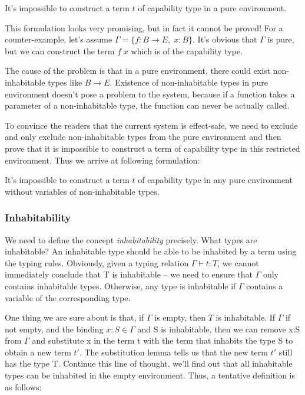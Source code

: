 \begin{definition}
  It's impossible to construct a term $t$ of capability type in a pure
  environment.
\end{definition}

This formulation looks very promising, but in fact it cannot be proved!
For a counter-example, let's assume $\Gamma = \{f: B \to E, \; x:
B\}$. It's obvious that $\Gamma$ is pure, but we can construct the
term $f \; x$ which is of the capability type.

The cause of the problem is that in a pure environment, there could
exist non-inhabitable types like $B \to E$.  Existence of
non-inhabitable types in pure environment doesn't pose a problem to
the system, because if a function takes a parameter of a
non-inhabitable type, the function can never be actually called.

To convince the readers that the current system is effect-safe, we
need to exclude and only exclude non-inhabitable types from the pure
environment and then prove that it is impossible to construct a term
of capability type in this restricted environment. Thus we arrive at
following formulation:

\begin{definition}
  It's impossible to construct a term $t$ of capability type in any
  pure environment without variables of non-inhabitable types.
\end{definition}

\subsubsection{Inhabitability}

We need to define the concept \emph{inhabitability} precisely. What
types are inhabitable? An inhabitable type should be able to be
inhabited by a term using the typing rules. Obviously, given a typing
relation $\Gamma \vdash t: T$, we cannot immediately conclude that T
is inhabitable -- we need to ensure that $\Gamma$ only contains
inhabitable types. Otherwise, any type is inhabitable if $\Gamma$
contains a variable of the corresponding type.

One thing we are sure about is that, if $\Gamma$ is empty, then $T$ is
inhabitable. If $\Gamma$ if not empty, and the binding
$x:S \in \Gamma$ and S is inhabitable, then we can remove x:S from
$\Gamma$ and substitute x in the term t with the term that inhabits
the type S to obtain a new term $t'$. The substitution lemma tells us
that the new term $t'$ still has the type T. Continue this line of
thought, we'll find out that all inhabitable types can be inhabited in
the empty environment. Thus, a tentative definition is as follows:

